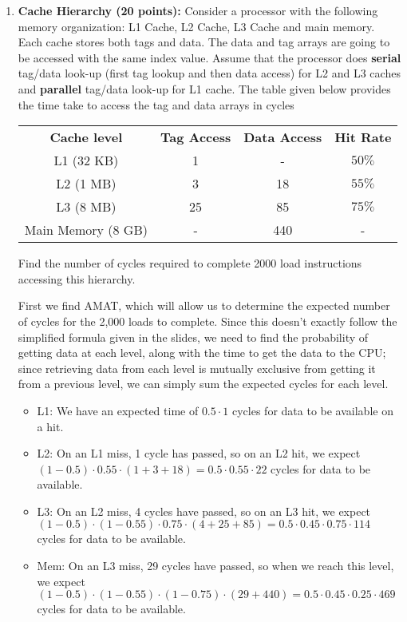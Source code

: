 \documentclass[a4paper, 11pt]{exam}
\begin{document}
\begin{enumerate}
 \item \textbf{Cache Hierarchy (20 points): } Consider a processor with the following memory
organization: L1 Cache, L2 Cache, L3 Cache and main memory. Each cache stores both tags
and data. The data and tag arrays are going to be accessed with the same index value. Assume
that the processor does \textbf{serial} tag/data look-up (first tag lookup and then data access) for L2
and L3 caches and \textbf{parallel} tag/data look-up for L1 cache. The table given below provides the
time take to access the tag and data arrays in cycles
\newline


\begin{center}
\begin{tabular}{|c|c|c|c|}
 \hline
 \textbf{Cache level} & \textbf{Tag Access} & \textbf{Data Access} & \textbf{Hit Rate} \\
 L1 (32 KB)  & 1 & - & $50\%$ \\
 \hline
 L2 (1 MB) & 3 & 18 & $55\%$ \\
 \hline
 L3 (8 MB) & 25 & 85 & $75\%$ \\
 \hline
 Main Memory (8 GB) & - & 440 & - \\
 \hline
\end{tabular}
\end{center}

Find the number of cycles required to complete 2000 load instructions accessing this
hierarchy. \newline

First we find AMAT, which will allow us to determine the expected number of cycles for the 2,000 loads to complete.
Since this doesn't exactly follow the simplified formula given in the slides, we need to find the probability of getting data at each level, along with
the time to get the data to the CPU; since retrieving data from each level is mutually exclusive from getting it from a previous level, we can simply sum
the expected cycles for each level.
\begin{itemize}
\item L1: We have an expected time of $0.5\cdot1$ cycles for data to be available on a hit.
\item L2: On an L1 miss, 1 cycle has passed, so on an L2 hit, we expect $(1-0.5)\cdot0.55\cdot(1+3+18) = 0.5\cdot0.55\cdot22$ cycles for data to be available.
\item L3: On an L2 miss, 4 cycles have passed, so on an L3 hit, we expect $(1-0.5)\cdot(1-0.55)\cdot0.75\cdot(4+25+85) = 0.5\cdot0.45\cdot0.75\cdot114$ cycles for data to be available.
\item Mem: On an L3 miss, 29 cycles have passed, so when we reach this level, we expect $(1-0.5)\cdot(1-0.55)\cdot(1-0.75)\cdot(29+440) = 0.5\cdot0.45\cdot0.25\cdot469$ cycles for data to be available.
\end{itemize}


\end{enumerate}
\end{document}

